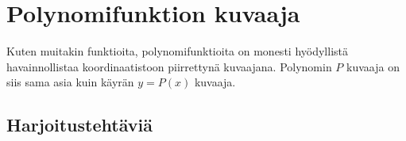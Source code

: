 \chapter{Polynomifunktion kuvaaja}
Kuten muitakin funktioita, polynomifunktioita on monesti hyödyllistä
havainnollistaa koordinaatistoon piirrettynä kuvaajana. Polynomin
$P$ kuvaaja on siis sama asia kuin käyrän $y = P(x)$ kuvaaja.

\begin{kuvaajapohja}{1.5}{-2}{2}{-3}{3}
\end{kuvaajapohja}

\section{Harjoitustehtäviä}
